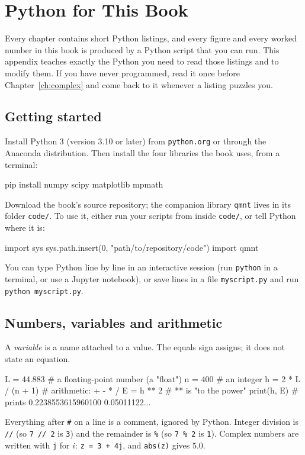 \renewcommand{\chapterart}{ap-python}\renewcommand{\chapterartcaption}{Four thousand random points in the unit square; the fraction inside the quarter circle estimates $\pi/4$. Five lines of Python.}
\chapter{Python for This Book}\label{ch:ap-python}

\begin{chapterintro}
Every chapter contains short Python listings, and every figure and every worked number in this book is produced by a Python script that you can run. This appendix teaches exactly the Python you need to read those listings and to modify them. If you have never programmed, read it once before Chapter~\ref{ch:complex} and come back to it whenever a listing puzzles you.
\end{chapterintro}

\section{Getting started}

Install Python 3 (version 3.10 or later) from \texttt{python.org} or through the Anaconda distribution. Then install the four libraries the book uses, from a terminal:
\begin{pycode}
pip install numpy scipy matplotlib mpmath
\end{pycode}
Download the book's source repository; the companion library \texttt{qmnt} lives in its folder \texttt{code/}. To use it, either run your scripts from inside \texttt{code/}, or tell Python where it is:
\begin{pycode}
import sys
sys.path.insert(0, "path/to/repository/code")
import qmnt
\end{pycode}
You can type Python line by line in an interactive session (run \texttt{python} in a terminal, or use a Jupyter notebook), or save lines in a file \texttt{myscript.py} and run \texttt{python myscript.py}.

\section{Numbers, variables and arithmetic}

A \emph{variable} is a name attached to a value. The equals sign assigns; it does not state an equation.
\begin{pycode}
L = 44.883          # a floating-point number (a "float")
n = 400             # an integer
h = 2 * L / (n + 1) # arithmetic: + - * /
E = h ** 2          # ** is "to the power"
print(h, E)         # prints 0.2238553615960100 0.05011122...
\end{pycode}
Everything after \texttt{\#} on a line is a comment, ignored by Python. Integer division is \texttt{//} (so \texttt{7 // 2} is \texttt{3}) and the remainder is \texttt{\%} (so \texttt{7 \% 2} is \texttt{1}). Complex numbers are written with \texttt{j} for $i$: \texttt{z = 3 + 4j}, and \texttt{abs(z)} gives $5.0$.

